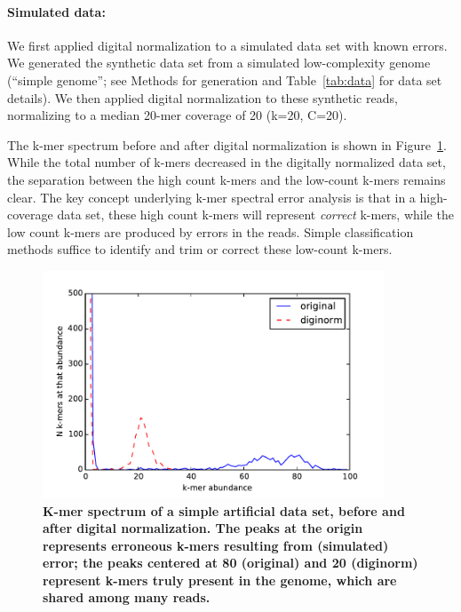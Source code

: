 \documentclass{article}
\begin{document}
\paragraph{Simulated data:}
We first applied digital normalization to a simulated data set with
known errors.  We generated the synthetic data set from a simulated
low-complexity genome (``simple genome''; see Methods for generation
and Table~\ref{tab:data} for data set details). We then applied
digital normalization to these synthetic reads, normalizing to a
median 20-mer coverage of 20 (k=20, C=20).

The k-mer spectrum before and after digital normalization is shown in
Figure~\ref{fig:spectrum}.  While the total number of k-mers decreased
in the digitally normalized data set, the separation between the high
count k-mers and the low-count k-mers remains clear.  The key concept
underlying k-mer spectral error analysis is that in a high-coverage
data set, these high count k-mers will represent {\em correct} k-mers,
while the low count k-mers are produced by errors in the reads.
Simple classification methods suffice to identify and trim or correct
these low-count k-mers.

\begin{figure}[!ht]
 \centerline{\includegraphics[width=4in]{./figures/kmer-spectrum}}
\caption{\bf K-mer spectrum of a simple artificial data set, before
  and after digital normalization.  The peaks at the origin represents
  erroneous k-mers resulting from (simulated) error; the peaks
  centered at 80 (original) and 20 (diginorm) represent k-mers truly
  present in the genome, which are shared among many reads.}
\label{fig:spectrum}
\end{figure}


\end{document}
